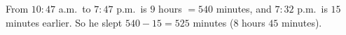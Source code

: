 From $10{:}47$ a.m.\ to $7{:}47$ p.m.\ is $9$ hours $=540$ minutes, and $7{:}32$ p.m.\ is $15$ minutes earlier. So he slept $540-15=\boxed{525}$ minutes ($8$ hours $45$ minutes).
